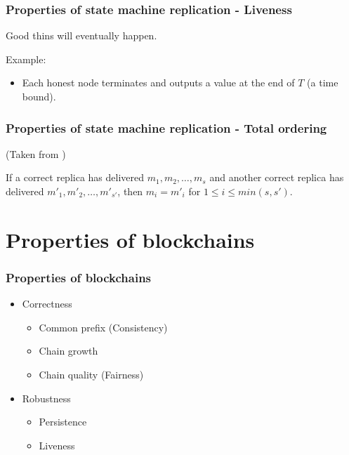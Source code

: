 \documentclass{beamer}
\begin{document}
\begin{frame}
\frametitle{Properties of state machine replication - Liveness}

Good thins will eventually happen.

Example:
\begin{itemize}
    \item Each honest node terminates and outputs a value at the end of $T$ (a time bound).
\end{itemize}

\end{frame}


\begin{frame}
\frametitle{Properties of state machine replication - Total ordering}

(Taken from \cite{duan2018beat}) 

\begin{definition}
If a correct replica has delivered $m_1, m_2, \dots ,m_s$ and another correct replica has delivered $m'_1,m'_2, \dots,m'_{s'}$, then $m_i = m'_i$ for $1 \leq i \leq min(s, s')$.
\end{definition}

\end{frame}


\section{Properties of blockchains}

\begin{frame}
\frametitle{Properties of blockchains}

\begin{itemize}
    \item Correctness
    \begin{itemize}
        \item Common prefix (Consistency)
        \item Chain growth
        \item Chain quality (Fairness)
    \end{itemize}
    \item Robustness
    \begin{itemize}
        \item Persistence
        \item Liveness
    \end{itemize}
\end{itemize}

\end{frame}
\end{document}
